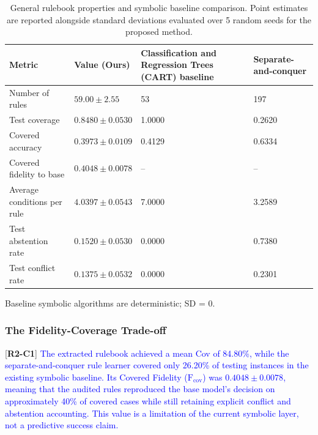 \documentclass[make,article,submit,pdftex,moreauthors]{Definitions/mdpi}
\newcommand{\revtag}[2]{[\textbf{R#1-C#2}]}
\newcommand{\Rtwo}[1]{\textcolor{blue}{#1}}
\begin{document}
\begin{table}[!ht]
\caption{General rulebook properties and symbolic baseline comparison. Point estimates are reported alongside standard deviations evaluated over 5 random seeds for the proposed method.\label{tab:rulebook_summary}}
\centering
\begin{tabularx}{\textwidth}{lLLL}
\toprule
\textbf{Metric} & \textbf{Value (Ours)} & \textbf{Classification and Regression Trees (CART) baseline} & \textbf{Separate-and-conquer} \\
\midrule
Number of rules & $59.00 \pm 2.55$ & 53 & 197 \\
Test coverage & $0.8480 \pm 0.0530$ & 1.0000 & 0.2620 \\
Covered accuracy & $0.3973 \pm 0.0109$ & 0.4129 & 0.6334 \\
Covered fidelity to base & $0.4048 \pm 0.0078$ & -- & -- \\
Average conditions per rule & $4.0397 \pm 0.0543$ & 7.0000 & 3.2589 \\
Test abstention rate & $0.1520 \pm 0.0530$ & 0.0000 & 0.7380 \\
Test conflict rate & $0.1375 \pm 0.0532$ & 0.0000 & 0.2301 \\
\bottomrule
\end{tabularx}
\vspace{2pt}\raggedright \footnotesize{Baseline symbolic algorithms are deterministic; SD = 0.}
\end{table}

\subsubsection{The Fidelity-Coverage Trade-off}
\label{subsubsec:fidelity_tradeoff}

\revtag{2}{1} \Rtwo{The extracted rulebook achieved a mean Cov of 84.80\%, while the separate-and-conquer rule learner covered only 26.20\% of testing instances in the existing symbolic baseline. Its Covered Fidelity ($\mathrm{F}_{\text{cov}}$) was $0.4048 \pm 0.0078$, meaning that the audited rules reproduced the base model's decision on approximately 40\% of covered cases while still retaining explicit conflict and abstention accounting. This value is a limitation of the current symbolic layer, not a predictive success claim.}
\end{document}
